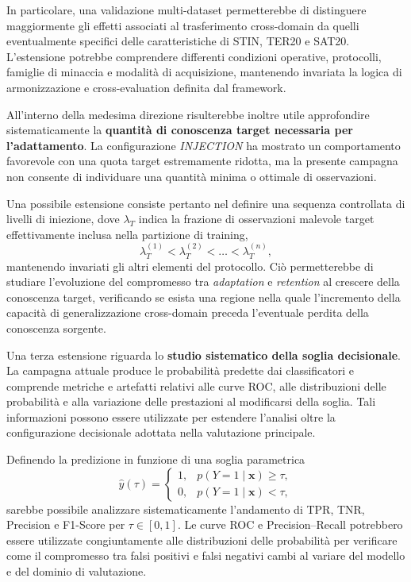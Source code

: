 In particolare, una validazione multi-dataset permetterebbe di distinguere maggiormente gli effetti associati al trasferimento cross-domain da quelli eventualmente specifici delle caratteristiche di STIN, TER20 e SAT20.
L'estensione potrebbe comprendere differenti condizioni operative, protocolli, famiglie di minaccia e modalità di acquisizione, mantenendo invariata la logica di armonizzazione e cross-evaluation definita dal framework.

All'interno della medesima direzione risulterebbe inoltre utile approfondire sistematicamente la \textbf{quantità di conoscenza target necessaria per l'adattamento}.
La configurazione \textit{INJECTION} ha mostrato un comportamento favorevole con una quota target estremamente ridotta, ma la presente campagna non consente di individuare una quantità minima o ottimale di osservazioni.

Una possibile estensione consiste pertanto nel definire una sequenza controllata di livelli di iniezione, dove $\lambda_T$ indica la frazione di osservazioni malevole target effettivamente inclusa nella partizione di training,
\[
    \lambda_{T}^{(1)} < \lambda_{T}^{(2)} < \dots < \lambda_{T}^{(n)},
\]
mantenendo invariati gli altri elementi del protocollo.
Ciò permetterebbe di studiare l'evoluzione del compromesso tra \textit{adaptation} e \textit{retention} al crescere della conoscenza target, verificando se esista una regione nella quale l'incremento della capacità di generalizzazione cross-domain preceda l'eventuale perdita della conoscenza sorgente.

Una terza estensione riguarda lo \textbf{studio sistematico della soglia decisionale}.
La campagna attuale produce le probabilità predette dai classificatori e comprende metriche e artefatti relativi alle curve ROC, alle distribuzioni delle probabilità e alla variazione delle prestazioni al modificarsi della soglia.
Tali informazioni possono essere utilizzate per estendere l'analisi oltre la configurazione decisionale adottata nella valutazione principale.

Definendo la predizione in funzione di una soglia parametrica
\[
    \hat{y}(\tau) =
    \begin{cases}
        1, & p(Y=1 \mid \mathbf{x}) \geq \tau, \\
        0, & p(Y=1 \mid \mathbf{x}) < \tau,
    \end{cases}
\]
sarebbe possibile analizzare sistematicamente l'andamento di TPR, TNR, Precision e F1-Score per $\tau \in [0,1]$.
Le curve ROC e Precision--Recall potrebbero essere utilizzate congiuntamente alle distribuzioni delle probabilità per verificare come il compromesso tra falsi positivi e falsi negativi cambi al variare del modello e del dominio di valutazione.

